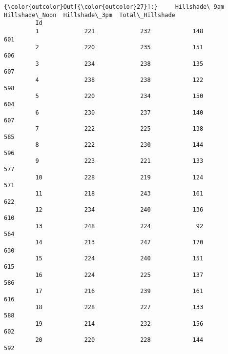 \documentclass[11pt]{article}
\begin{document}
\begin{Verbatim}[commandchars=\\\{\}]
{\color{outcolor}Out[{\color{outcolor}27}]:}     Hillshade\_9am  Hillshade\_Noon  Hillshade\_3pm  Total\_Hillshade
         Id                                                               
         1             221             232            148              601
         2             220             235            151              606
         3             234             238            135              607
         4             238             238            122              598
         5             220             234            150              604
         6             230             237            140              607
         7             222             225            138              585
         8             222             230            144              596
         9             223             221            133              577
         10            228             219            124              571
         11            218             243            161              622
         12            234             240            136              610
         13            248             224             92              564
         14            213             247            170              630
         15            224             240            151              615
         16            224             225            137              586
         17            216             239            161              616
         18            228             227            133              588
         19            214             232            156              602
         20            220             228            144              592
\end{Verbatim}
            
\end{document}
